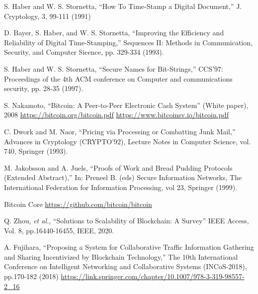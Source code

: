\documentclass[graybox]{svmult}
\begin{document}




\begin{thebibliography}{99}

  S. Haber and W. S. Stornetta, 
  ``How To Time-Stamp a Digital Document,''
  J. Cryptology, 3, 99-111 (1991)

  D. Bayer, S. Haber, and W. S. Stornetta,
  ``Improving the Efficiency and Reliability of Digital Time-Stamping,''
  Sequences II: Methods in Communication, Security, and Computer Sicence, 
  pp. 329-334 (1993).

  S. Haber and W. S. Stornetta, 
  ``Secure Names for Bit-Strings,''
  CCS'97: Proceedings of the 4th ACM conference on Computer and 
  communications security, pp. 28-35 (1997).


  S. Nakamoto, 
  ``Bitcoin: A Peer-to-Peer Electronic Cash System''
  (White paper), 2008 
  \url{https://bitcoin.org/bitcoin.pdf}
  \url{https://www.bitcoinsv.io/bitcoin.pdf}


  C. Dwork and M. Naor, 
  ``Pricing via Processing or Combatting Junk Mail,''
  Advances in Cryptology (CRYPTO'92), 
  Lecture Notes in Computer Science, vol. 740, Springer (1993). 


  M. Jakobsson and A. Juels, 
  ``Proofs of Work and Bread Pudding Protocols (Extended Abstract),''
  In: Preneel B. (eds) Secure Information Networks, 
  The International Federation for Information Processing, 
  vol 23, Springer (1999).


  Bitcoin Core 
  \url{https://github.com/bitcoin/bitcoin}


  Q. Zhou, \textit{et al.}, 
  ``Solutions to Scalability of Blockchain: A Survey''
  IEEE Access, Vol. 8, pp.16440-16455, IEEE, 2020. 


  A. Fujihara,
  ``Proposing a System for Collaborative Traffic Information Gathering and 
  Sharing Incentivized by Blockchain Technology,''
  The 10th International Conference on Intelligent Networking and 
  Collaborative Systems (INCoS-2018), pp.170-182 (2018)
  \url{https://link.springer.com/chapter/10.1007/978-3-319-98557-2_16}


\end{thebibliography}
\end{document}
